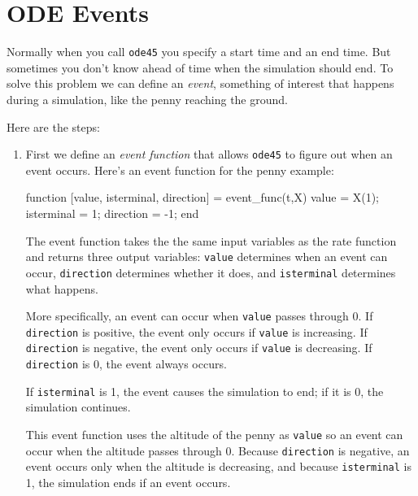 \section{ODE Events}
\label{events}


Normally when you call \lstinline{ode45} you specify a start time and
an end time.  But sometimes you don't know ahead of time when the
simulation should end.  To solve this problem we can define an \emph{event}, 
something of interest that happens during a simulation,
like the penny reaching the ground.

Here are the steps: 


\begin{enumerate}

\item First we define an \emph{event function} that allows \lstinline{ode45} to figure out when
an event occurs.  Here's an event function for the penny example:

\begin{code}
function [value, isterminal, direction] = event_func(t,X)
    value = X(1);
    isterminal = 1;
    direction = -1;
end
\end{code}

The event function takes the the same input variables as the rate function and returns three output variables: \lstinline{value} determines when an event can occur, \lstinline{direction} determines whether it does, and \lstinline{isterminal} determines what happens.

More specifically, an event can occur when \lstinline{value} passes through 0.
If \lstinline{direction} is positive, the event only occurs if \lstinline{value} is increasing.
If \lstinline{direction} is negative, the event only occurs if \lstinline{value} is decreasing.
If \lstinline{direction} is 0, the event always occurs.

If \lstinline{isterminal} is 1, the event causes the simulation to end; if it is 0, the simulation continues.

This event function uses the altitude of the penny as \lstinline{value} so an event can occur when the altitude passes through 0.  
Because \lstinline{direction} is negative, an event occurs only when the altitude is decreasing, and
because \lstinline{isterminal} is 1, the simulation ends if an event occurs.



\end{enumerate}
